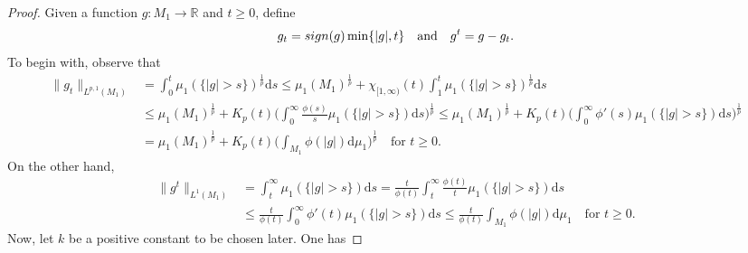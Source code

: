 \documentclass[10pt,a4paper]{amsart}
\def\R{\mathbb R}
\def\d{\mathrm{d}}
\begin{document}
\begin{proof}
Given a function $g:M_1\to\R$ and $t\geq 0$, define 
$$g_t= {\rm sign} (g) \min\{|g|,t\} \quad \text{and} \quad g^t= g- g_t.$$
To begin with, observe that
\begin{align}
    \label{SP4}
    \|g_t\|_{L^{p,1}(M_1)} &= \int_0^t\mu_1(\{|g|>s\})^{\frac 1p}\d s \leq \mu_1(M_1)^{\frac 1p}+ \chi_{[1,\infty)}(t)\int_1^t\mu_1(\{|g|>s\})^{\frac 1p}\d s
    \\ \nonumber &\leq 
    \mu_1(M_1)^{\frac 1p} + K_p(t) \bigg(\int_0^\infty \frac{\phi(s)}s \mu_1(\{|g|>s\})\d s\bigg)^{\frac{1}{p}}
   \leq 
    \mu_1(M_1)^{\frac 1p} + K_p(t) \bigg(\int_0^\infty \phi'(s)\mu_1(\{|g|>s\})\d s\bigg)^{\frac{1}{p}}
    \\ \nonumber & =  \mu_1(M_1)^{\frac 1p} + K_p(t) \bigg(\int_{M_1}\phi(|g|)\d \mu_1\bigg)^{\frac 1p}   \quad \text{for $t \geq 0$.}
\end{align}
On the other hand,
\begin{align}\label{SP5}
\|g^t\|_{L^1(M_1)} & = \int_t^\infty \mu_1(\{|g|>s\})\d s= \frac{t}{\phi(t)} \int_t^\infty \frac{\phi(t)}{t}\mu_1(\{|g|>s\})\d s
\\ & \leq \nonumber  
\frac{t}{\phi(t)} \int _0^\infty \phi'(t)\mu_1(\{|g|>s\})\d s
   \leq  \frac{t}{\phi(t)} \int_{M_1}\phi(|g|)\d \mu_1 \quad \text{for $t \geq 0$.}
\end{align}
   Now,  let $k$ be a positive constant to be chosen later. One has


\end{proof}
\end{document}
